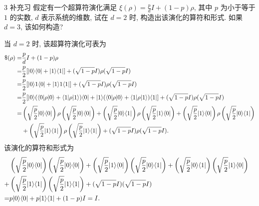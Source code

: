\documentclass{assignment}
\begin{document}
\begin{probcontinued}{3 补充习}
    假定有一个超算符演化满足 $\xi(\rho)=\frac{p}{d}I+(1-p)\rho$, 其中 $p$ 为小于等于 $1$ 的实数, $d$ 表示系统的维数, 试在 $d=2$ 时, 构造出该演化的算符和形式. 如果 $d=3$, 该如何构造?
\end{probcontinued}
\begin{sol}
    当 $d=2$ 时, 该超算符演化可表为
    \begin{align}
        \notag\$(\rho)=&\frac{p}{d}I+(1-p)\rho\\
        \notag=&\frac{p}{2}[\lvert 0\rangle\langle 0\rvert+\lvert 1\rangle\langle 1\rvert]+(\sqrt{1-p}I)\rho(\sqrt{1-p}I)\\
        \notag=&\frac{p}{2}[\lvert 0\rangle 1\langle 0\rvert+\lvert 1\rangle 1\langle 1\rvert]+(\sqrt{1-p}I)\rho(\sqrt{1-p}I)\\
        \notag=&\frac{p}{2}[\lvert 0\rangle(\langle 0\rvert\rho\lvert 0\rangle+\langle 1\rvert\rho\lvert 1\rangle)\langle 0\rvert+\lvert 1\rangle(\langle 0\rvert\rho\lvert 0\rangle+\langle 1\rvert\rho\lvert 1\rangle)\langle 1\rvert]+(\sqrt{1-p}I)\rho(\sqrt{1-p}I)\\
        \notag=&\left(\sqrt{\frac{p}{2}}\lvert 0\rangle\langle 0\rvert\right)\rho\left(\sqrt{\frac{p}{2}}\lvert 0\rangle\langle 0\rvert\right)+\left(\sqrt{\frac{p}{2}}\lvert 0\rangle\langle 1\rvert\right)\rho\left(\sqrt{\frac{p}{2}}\lvert 1\rangle\langle 0\rvert\right)+\left(\sqrt{\frac{p}{2}}\lvert 1\rangle\langle 0\rvert\right)\rho\left(\sqrt{\frac{p}{2}}\lvert 0\rangle\langle 1\rvert\right)\\
        &+\left(\sqrt{\frac{p}{2}}\lvert 1\rangle\langle 1\rvert\right)\rho\left(\sqrt{\frac{p}{2}}\lvert 1\rangle\langle 1\rvert\right)+(\sqrt{1-p}I)\rho(\sqrt{1-p}I).
    \end{align}
    该演化的算符和形式为
    \begin{align}
        \notag&\left(\sqrt{\frac{p}{2}}\lvert 0\rangle\langle 0\rvert\right)\left(\sqrt{\frac{p}{2}}\lvert 0\rangle\langle 0\rvert\right)+\left(\sqrt{\frac{p}{2}}\lvert 1\rangle\langle 0\rvert\right)\left(\sqrt{\frac{p}{2}}\lvert 0\rangle\langle 1\rvert\right)+\left(\sqrt{\frac{p}{2}}\lvert 0\rangle\langle 1\rvert\right)\left(\sqrt{\frac{p}{2}}\lvert 1\rangle\langle 0\rvert\right)&\\
        \notag+&\left(\sqrt{\frac{p}{2}}\lvert 1\rangle\langle 1\rvert\right)\left(\sqrt{\frac{p}{2}}\lvert 1\rangle\langle 1\rvert\right)+(\sqrt{1-p}I)(\sqrt{1-p}I)\\
        =&p\lvert 0\rangle\langle 0\rvert+p\lvert 1\rangle\langle 1\rvert+(1-p)I=I.
    \end{align}


\end{sol}
\end{document}
